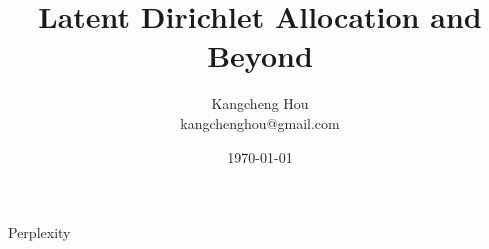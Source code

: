 \documentclass{beamer}
\title{Latent Dirichlet Allocation and Beyond}
\author{Kangcheng Hou\\kangchenghou@gmail.com}
\institute{Zhejiang University}
\date{\today}
\begin{document}
    
\frame{\titlepage}







\begin{frame}{Perplexity}
\end{frame}
\end{document}
